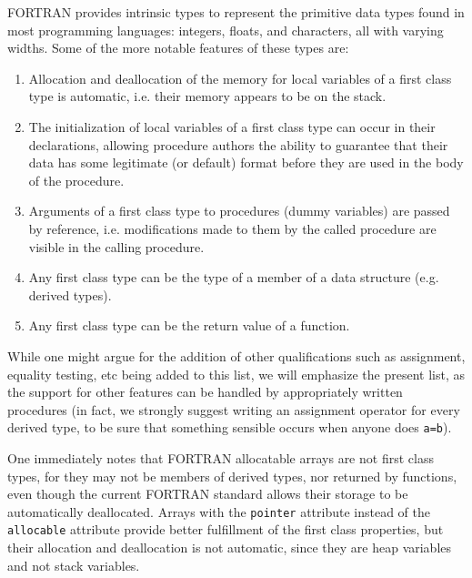 FORTRAN provides intrinsic types to represent the primitive data types
found in most programming languages: integers, floats, and characters, all
with varying widths.  
Some of the more notable features of these types are:

\begin{enumerate}

\item Allocation and deallocation of the memory for local variables of
a first class type is automatic, i.e. their memory appears to be on
the stack.

\item The initialization of local variables of a first class type can
occur in their declarations, allowing procedure authors the ability to
guarantee that their data has some legitimate (or default) format
before they are used in the body of the procedure.

\item Arguments of a first class type to procedures (dummy variables)
are passed by reference, i.e. modifications made to them by the
called procedure are visible in the calling procedure.

\item Any first class type can be the type of a member of a data structure
(e.g. derived types).

\item Any first class type can be the return value of a function.

\end{enumerate}

While one might argue for the addition of other qualifications such as
assignment, equality testing, etc being added to this list, we will
emphasize the present list, as the support for other features can be
handled by appropriately written procedures (in fact, we strongly
suggest writing an assignment operator for every derived type, to
be sure that something sensible occurs when anyone does \verb+a=b+).

One immediately notes that FORTRAN allocatable arrays are not first
class types, for they may not be members of derived types, nor
returned by functions, even though the current FORTRAN standard allows
their storage to be automatically deallocated.  Arrays with the
\verb+pointer+ attribute instead of the \verb+allocable+ attribute
provide better fulfillment of the first class properties, but their
allocation and deallocation is not automatic, since they are heap
variables and not stack variables.

